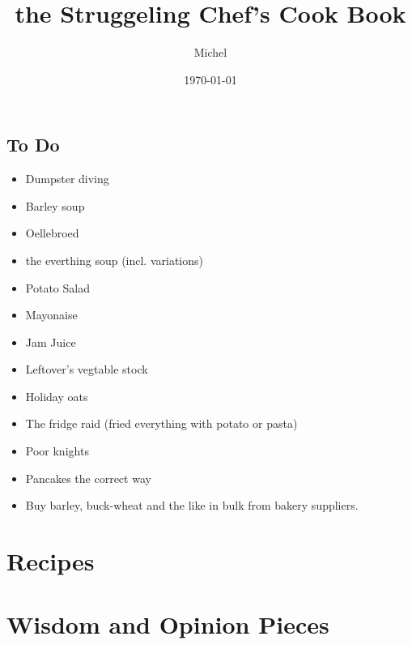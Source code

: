 \documentclass[12pt]{report}
\title{\sc the Struggeling Chef's Cook Book}
\author{Michel}
\date{\today}
\begin{document}
\maketitle
\tableofcontents

\section{To Do}{
  \begin{itemize}
    \item Dumpster diving
    \item Barley soup
    \item Oellebroed
    \item the everthing soup (incl. variations)
    \item Potato Salad
    \item Mayonaise
    \item Jam Juice
    \item Leftover's vegtable stock
    \item Holiday oats
    \item The fridge raid (fried everything with potato or pasta)
    \item Poor knights
    \item Pancakes the correct way
    \item Buy barley, buck-wheat and the like in bulk from bakery suppliers.
  \end{itemize}

}

\clearpage
\chapter{\sc Recipes}
\begin{multicols}{2}
\end{multicols}

\clearpage

\chapter{\sc Wisdom and Opinion Pieces}

\end{document}
